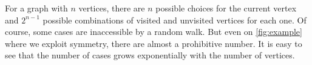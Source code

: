 \documentclass[12pt]{article}
\theoremstyle{definition}
\begin{document}
For a graph with $n$ vertices, there are $n$ possible choices for the current
vertex and $2^{n-1}$ possible combinations of visited and unvisited vertices
for each one.
Of course, some cases are inaccessible by a random walk.
But even on \cref{fig:example} where we exploit symmetry,
there are almost a prohibitive number.
It is easy to see that the number of cases 
grows exponentially with the number of vertices.

\begin{figure}[ht]
	\centering
\end{figure}
\end{document}
